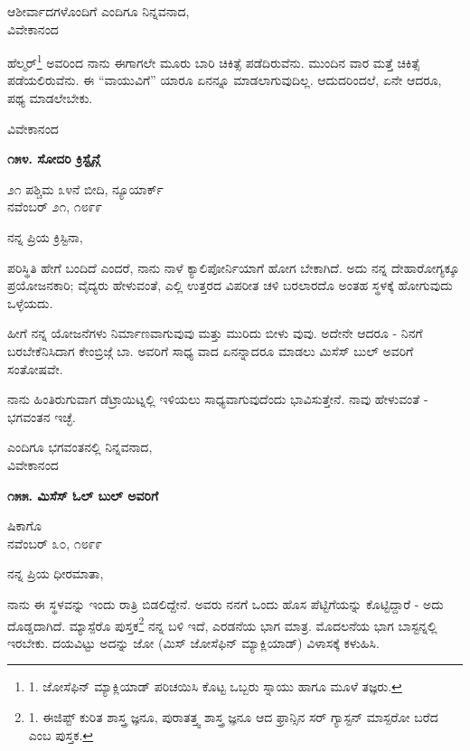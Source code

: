 \begin{flushright}
ಆಶೀರ್ವಾದಗಳೊಂದಿಗೆ ಎಂದಿಗೂ ನಿನ್ನವನಾದ,\\ವಿವೇಕಾನಂದ
\end{flushright}

ಹೆಲ್ಮರ್\footnote{1. ಜೋಸೆಫಿನ್ ಮ್ಯಾಕ್ಲಿಯಾಡ್ ಪರಿಚಯಿಸಿ ಕೊಟ್ಟ ಒಬ್ಬರು ಸ್ನಾಯು ಹಾಗೂ ಮೂಳೆ ತಜ್ಞರು.} ಅವರಿಂದ ನಾನು ಈಗಾಗಲೇ ಮೂರು ಬಾರಿ ಚಿಕಿತ್ಸೆ ಪಡೆದಿರುವೆನು. ಮುಂದಿನ ವಾರ ಮತ್ತೆ ಚಿಕಿತ್ಸೆ ಪಡೆಯಲಿರುವೆನು. ಈ “ವಾಯುವಿಗೆ” ಯಾರೂ ಏನನ್ನೂ ಮಾಡಲಾಗುವುದಿಲ್ಲ. ಆದುದರಿಂದಲೆ, ಏನೇ ಆದರೂ, ಪಥ್ಯ ಮಾಡಲೇಬೇಕು.

\begin{flushright}
ವಿವೇಕಾನಂದ
\end{flushright}

\begin{center}
\textbf{೧೫೪. ಸೋದರಿ ಕ್ರಿಸ್ಟೈನ್ಗೆ}
\end{center}

\begin{flushright}
೨೧ ಪಶ್ಚಿಮ ೩೪ನೆ ಬೀದಿ, ನ್ಯೂಯಾರ್ಕ್\\ನವೆಂಬರ್ ೨೧, ೧೮೯೯
\end{flushright}

ನನ್ನ ಪ್ರಿಯ ಕ್ರಿಸ್ಟಿನಾ,

ಪರಿಸ್ಥಿತಿ ಹೇಗೆ ಬಂದಿದೆ ಎಂದರೆ, ನಾನು ನಾಳೆ ಕ್ಯಾಲಿಪೋರ್ನಿಯಾಗೆ ಹೋಗ ಬೇಕಾಗಿದೆ. ಅದು ನನ್ನ ದೇಹಾರೋಗ್ಯಕ್ಕೂ ಪ್ರಯೋಜನಕಾರಿ; ವೈದ್ಯರು ಹೇಳುವಂತೆ, ಎಲ್ಲಿ ಉತ್ತರದ ವಿಪರೀತ ಚಳಿ ಬರಲಾರದೊ ಅಂತಹ ಸ್ಥಳಕ್ಕೆ ಹೋಗುವುದು ಒಳ್ಳೆಯದು.

ಹೀಗೆ ನನ್ನ ಯೋಜನೆಗಳು ನಿರ್ಮಾಣವಾಗುವುವು ಮತ್ತು ಮುರಿದು ಬೀಳು ವುವು. ಅದೇನೇ ಆದರೂ - ನಿನಗೆ ಬರಬೇಕೆನಿಸಿದಾಗ ಕೇಂಬ್ರಿಜ್ಗೆ ಬಾ. ಅವರಿಗೆ ಸಾಧ್ಯ ವಾದ ಏನನ್ನಾದರೂ ಮಾಡಲು ಮಿಸೆಸ್ ಬುಲ್ ಅವರಿಗೆ ಸಂತೋಷವೇ.

ನಾನು ಹಿಂತಿರುಗುವಾಗ ಡೆಟ್ರಾಯಿಟ್ನಲ್ಲಿ ಇಳಿಯಲು ಸಾಧ್ಯವಾಗುವುದೆಂದು ಭಾವಿಸುತ್ತೇನೆ. ನಾವು ಹೇಳುವಂತೆ - ಭಗವಂತನ ಇಚ್ಛೆ.

\begin{flushright}
ಎಂದಿಗೂ ಭಗವಂತನಲ್ಲಿ ನಿನ್ನವನಾದ,\\ವಿವೇಕಾನಂದ
\end{flushright}

\begin{center}
\textbf{೧೫೫. ಮಿಸೆಸ್ ಓಲ್ ಬುಲ್ ಅವರಿಗೆ}
\end{center}

\begin{flushright}
ಷಿಕಾಗೊ\\ನವೆಂಬರ್ ೩೦, ೧೮೯೯
\end{flushright}

ನನ್ನ ಪ್ರಿಯ ಧೀರಮಾತಾ,

ನಾನು ಈ ಸ್ಥಳವನ್ನು ಇಂದು ರಾತ್ರಿ ಬಿಡಲಿದ್ದೇನೆ. ಅವರು ನನಗೆ ಒಂದು ಹೊಸ ಪೆಟ್ಟಿಗೆಯನ್ನು ಕೊಟ್ಟಿದ್ದಾರೆ - ಅದು ದೊಡ್ಡದಾಗಿದೆ. ಮ್ಯಾಸ್ಪೆರೊ ಪುಸ್ತಕ\footnote{1. ಈಜಿಪ್ಟ್ ಕುರಿತ ಶಾಸ್ತ್ರ ಜ್ಞನೂ, ಪುರಾತತ್ತ್ವ ಶಾಸ್ತ್ರ ಜ್ಞನೂ ಆದ ಫ್ರಾನ್ಸಿನ ಸರ್ ಗ್ಯಾಸ್ಟನ್ ಮಾಸ್ಪರೋ ಬರೆದ  ಎಂಬ ಪುಸ್ತಕ.} ನನ್ನ ಬಳಿ ಇದೆ, ಎರಡನೆಯ ಭಾಗ ಮಾತ್ರ. ಮೊದಲನೆಯ ಭಾಗ ಬಾಸ್ಟನ್ನಲ್ಲಿ ಇರಬೇಕು. ದಯವಿಟ್ಟು ಅದನ್ನು ಜೋ (ಮಿಸ್ ಜೋಸೆಫಿನ್ ಮ್ಯಾಕ್ಲಿಯಾಡ್) ವಿಳಾಸಕ್ಕೆ ಕಳುಹಿಸಿ.

